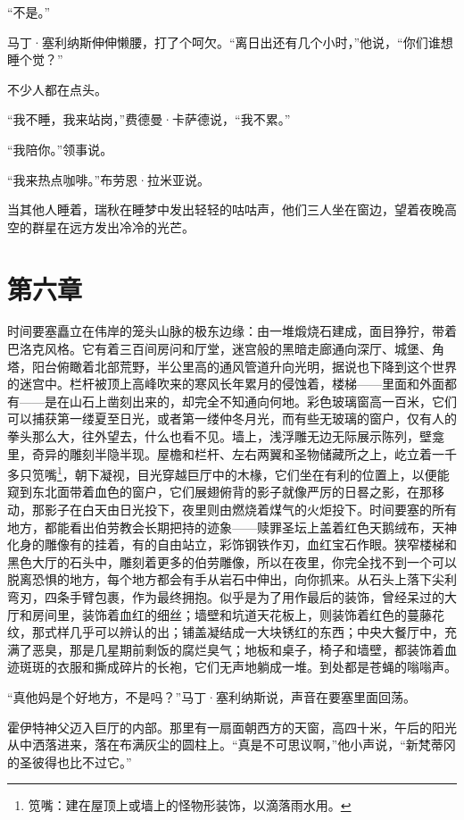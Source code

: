 \documentclass[AutoFakeBold=true]{book}
\begin{document}
``不是。''

马丁·塞利纳斯伸伸懒腰，打了个呵欠。``离日出还有几个小时，''他说，``你们谁想睡个觉？''

不少人都在点头。

``我不睡，我来站岗，''费德曼·卡萨德说，``我不累。''

``我陪你。''领事说。

``我来热点咖啡。''布劳恩·拉米亚说。

当其他人睡着，瑞秋在睡梦中发出轻轻的咕咕声，他们三人坐在窗边，望着夜晚高空的群星在远方发出冷冷的光芒。

\chapter{第六章}

时间要塞矗立在伟岸的笼头山脉的极东边缘：由一堆煅烧石建成，面目狰狞，带着巴洛克风格。它有着三百间房问和厅堂，迷宫般的黑暗走廊通向深厅、城堡、角塔，阳台俯瞰着北部荒野，半公里高的通风管道升向光明，据说也下降到这个世界的迷宫中。栏杆被顶上高峰吹来的寒风长年累月的侵蚀着，楼梯——里面和外面都有——是在山石上凿刻出来的，却完全不知通向何地。彩色玻璃窗高一百米，它们可以捕获第一缕夏至日光，或者第一缕仲冬月光，而有些无玻璃的窗户，仅有人的拳头那么大，往外望去，什么也看不见。墙上，浅浮雕无边无际展示陈列，壁龛里，奇异的雕刻半隐半现。屋檐和栏杆、左右两翼和圣物储藏所之上，屹立着一千多只笕嘴\footnote{笕嘴：建在屋顶上或墙上的怪物形装饰，以滴落雨水用。}，朝下凝视，目光穿越巨厅中的木椽，它们坐在有利的位置上，以便能窥到东北面带着血色的窗户，它们展翅俯背的影子就像严厉的日晷之影，在那移动，那影子在白天由日光投下，夜里则由燃烧着煤气的火炬投下。时间要塞的所有地方，都能看出伯劳教会长期把持的迹象——赎罪圣坛上盖着红色天鹅绒布，天神化身的雕像有的挂着，有的自由站立，彩饰钢铁作刃，血红宝石作眼。狭窄楼梯和黑色大厅的石头中，雕刻着更多的伯劳雕像，所以在夜里，你完全找不到一个可以脱离恐惧的地方，每个地方都会有手从岩石中伸出，向你抓来。从石头上落下尖利弯刃，四条手臂包裹，作为最终拥抱。似乎是为了用作最后的装饰，曾经呆过的大厅和房间里，装饰着血红的细丝；墙壁和坑道天花板上，则装饰着红色的蔓藤花纹，那式样几乎可以辨认的出；铺盖凝结成一大块锈红的东西；中央大餐厅中，充满了恶臭，那是几星期前剩饭的腐烂臭气；地板和桌子，椅子和墙壁，都装饰着血迹斑斑的衣服和撕成碎片的长袍，它们无声地躺成一堆。到处都是苍蝇的嗡嗡声。

``真他妈是个好地方，不是吗？''马丁·塞利纳斯说，声音在要塞里面回荡。

霍伊特神父迈入巨厅的内部。那里有一扇面朝西方的天窗，高四十米，午后的阳光从中洒落进来，落在布满灰尘的圆柱上。``真是不可思议啊，''他小声说，``新梵蒂冈的圣彼得也比不过它。''
\end{document}
